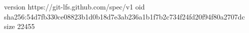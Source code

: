 version https://git-lfs.github.com/spec/v1
oid sha256:54d7fb330ce08823b1d0b18d7e3ab236a1b1f7b2c734f24fd20f94f80a2707dc
size 22455

